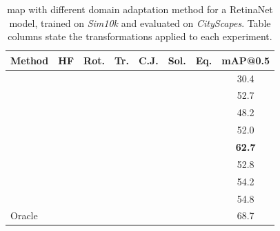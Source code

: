 \documentclass[%
    corpo=12pt,
    twoside,
    stile=classica,   
    tipotesi=magistrale,
    evenboxes,
    english,
	numerazioneromana,
]{toptesi}
\newcommand{\hdrule}{\midrule[\heavyrulewidth]}
\begin{document}
\begin{table}[t!]
	\centering
	\caption{\gls{map} with different domain adaptation method for a RetinaNet model, trained on \textit{Sim10k} and evaluated on \textit{CityScapes}. Table columns state the transformations applied to each experiment.}
	\begin{NiceTabularX}{\linewidth}{Xccccccc}
		\toprule
		Method & HF & Rot. & Tr. & C.J. & Sol. & Eq. & mAP@0.5 \\
		\hdrule
		 & \checkmark & & & & & & 30.4   \\
		 & \checkmark & \checkmark & \checkmark & \checkmark & \checkmark & \checkmark & 52.7   \\
		\midrule
		 & \checkmark & & & & & & 48.2   \\
		& \checkmark & \checkmark & \checkmark & & & & 52.0   \\
		& \checkmark & \checkmark & \checkmark & \checkmark & & & \textbf{62.7}   \\
		\midrule
		 & \checkmark & & & & & & 52.8   \\
		& \checkmark & \checkmark & \checkmark & & & & 54.2   \\
		& \checkmark & \checkmark & \checkmark & \checkmark & & & 54.8   \\
		\hdrule
		Oracle & \checkmark & & & & & & 68.7   \\
		\bottomrule
	\end{NiceTabularX}
	\label{table:retinanet}
\end{table}
\end{document}
